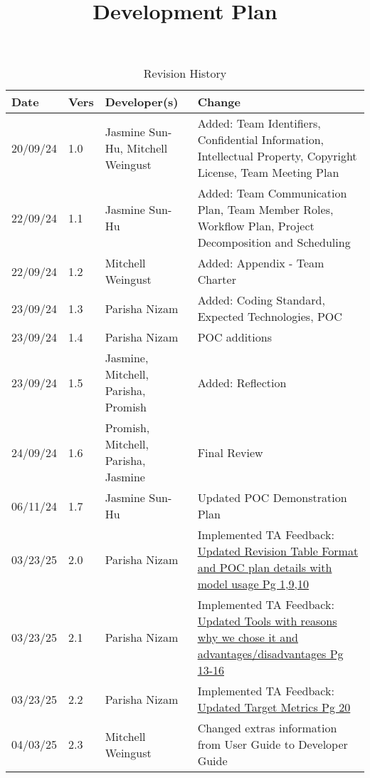 \documentclass{article}
\title{Development Plan\\\progname}
\author{\authname}
\date{}
\begin{document}
\maketitle

\begin{table}[hp]
\caption{Revision History} \label{TblRevisionHistory}
\begin{tabularx}{\textwidth}{p{1.3cm}p{1cm}p{3cm}X}
\toprule
\textbf{Date} & \textbf{Vers} & \textbf{Developer(s)} & \textbf{Change}\\
\midrule
20/09/24 & 1.0 & Jasmine Sun-Hu, Mitchell Weingust & Added: Team Identifiers, Confidential Information, Intellectual Property,
Copyright License, Team Meeting Plan\\
22/09/24 & 1.1 & Jasmine Sun-Hu & Added: Team Communication Plan, Team Member Roles, Workflow Plan, Project Decomposition and Scheduling\\
22/09/24 & 1.2 & Mitchell Weingust & Added: Appendix - Team Charter\\
23/09/24 & 1.3 & Parisha Nizam & Added: Coding Standard, Expected Technologies, POC \\
23/09/24 & 1.4 & Parisha Nizam & POC additions \\
23/09/24 & 1.5 & Jasmine, Mitchell, Parisha, Promish & Added: Reflection \\
24/09/24 & 1.6 & Promish, Mitchell, Parisha, Jasmine & Final Review\\
06/11/24 & 1.7 & Jasmine Sun-Hu & Updated POC Demonstration Plan\\
03/23/25 & 2.0 & Parisha Nizam & Implemented TA Feedback: \href{https://github.com/parishanizam/TeleHealth/issues/185}{Updated Revision Table Format and POC plan details with model usage Pg 1,9,10} \\
03/23/25 & 2.1 & Parisha Nizam & Implemented TA Feedback: \href{https://github.com/parishanizam/TeleHealth/issues/180}{Updated Tools with reasons why we chose it and advantages/disadvantages Pg 13-16}\\
03/23/25 & 2.2 & Parisha Nizam & Implemented TA Feedback: \href{https://github.com/parishanizam/TeleHealth/issues/235}{Updated Target Metrics Pg 20}\\
04/03/25 & 2.3 & Mitchell Weingust & Changed extras information from User Guide to Developer Guide\\
\bottomrule
\end{tabularx}
\end{table}

\newpage{}
\end{document}
